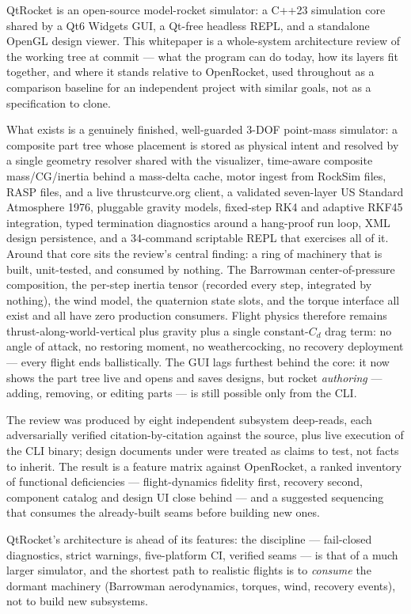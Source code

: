QtRocket is an open-source model-rocket simulator: a C++23 simulation core shared by a
Qt6 Widgets GUI, a Qt-free headless REPL, and a standalone OpenGL design viewer. This
whitepaper is a whole-system architecture review of the working tree at commit
 --- what the program can do today, how its layers fit together, and where
it stands relative to OpenRocket, used throughout as a comparison baseline for an
independent project with similar goals, not as a specification to clone.

What exists is a genuinely finished, well-guarded 3-DOF point-mass simulator: a
composite part tree whose placement is stored as physical intent and resolved by a
single geometry resolver shared with the visualizer, time-aware composite mass/CG/inertia
behind a mass-delta cache, motor ingest from RockSim files, RASP files, and a live
thrustcurve.org client, a validated seven-layer US Standard Atmosphere 1976, pluggable
gravity models, fixed-step RK4 and adaptive RKF45 integration, typed termination
diagnostics around a hang-proof run loop, XML design persistence, and a 34-command
scriptable REPL that exercises all of it. Around that core sits the review's central
finding: a ring of machinery that is built, unit-tested, and consumed by nothing. The
Barrowman center-of-pressure composition, the per-step inertia tensor (recorded every step, integrated by nothing), the wind model,
the quaternion state slots, and the torque interface all exist and all have zero
production consumers. Flight physics therefore remains thrust-along-world-vertical plus
gravity plus a single constant-$C_d$ drag term: no angle of attack, no restoring moment,
no weathercocking, no recovery deployment --- every flight ends ballistically. The GUI
lags furthest behind the core: it now shows the part tree live and opens and saves
 designs, but rocket \emph{authoring} --- adding, removing, or editing parts ---
is still possible only from the CLI.

The review was produced by eight independent subsystem deep-reads, each adversarially
verified citation-by-citation against the source, plus live execution of the CLI binary;
design documents under  were treated as claims to test, not facts to
inherit. The result is a feature matrix against OpenRocket, a ranked inventory of
functional deficiencies --- flight-dynamics fidelity first, recovery second, component
catalog and design UI close behind --- and a suggested sequencing that consumes the
already-built seams before building new ones.

\vspace{0.5em}
\begin{designrule}
QtRocket's architecture is ahead of its features: the discipline --- fail-closed
diagnostics, strict warnings, five-platform CI, verified seams --- is that of a much
larger simulator, and the shortest path to realistic flights is to \emph{consume} the
dormant machinery (Barrowman aerodynamics, torques, wind, recovery events), not to
build new subsystems.
\end{designrule}
